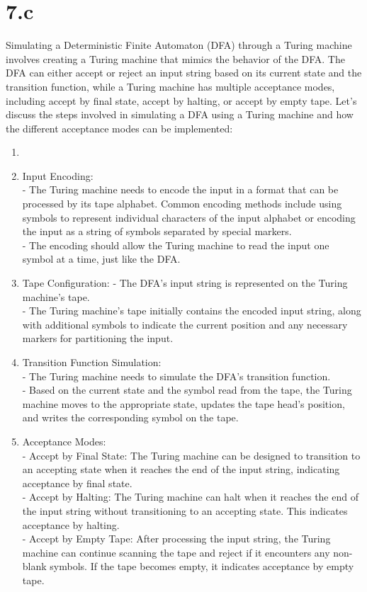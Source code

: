 \section{7.c}
Simulating a Deterministic Finite Automaton (DFA) through a Turing machine involves creating a Turing machine that mimics the behavior of the DFA. The DFA can either accept or reject an input string based on its current state and the transition function, while a Turing machine has multiple acceptance modes, including accept by final state, accept by halting, or accept by empty tape. Let's discuss the steps involved in simulating a DFA using a Turing machine and how the different acceptance modes can be implemented:
\begin{enumerate}
	\item 

\item Input Encoding:\\
   - The Turing machine needs to encode the input in a format that can be processed by its tape alphabet. Common encoding methods include using symbols to represent individual characters of the input alphabet or encoding the input as a string of symbols separated by special markers.\\
   - The encoding should allow the Turing machine to read the input one symbol at a time, just like the DFA.\\

\item Tape Configuration:
   - The DFA's input string is represented on the Turing machine's tape.\\
   - The Turing machine's tape initially contains the encoded input string, along with additional symbols to indicate the current position and any necessary markers for partitioning the input.

\item Transition Function Simulation:\\
   - The Turing machine needs to simulate the DFA's transition function.\\
   - Based on the current state and the symbol read from the tape, the Turing machine moves to the appropriate state, updates the tape head's position, and writes the corresponding symbol on the tape.

\item Acceptance Modes:\\
   - Accept by Final State: The Turing machine can be designed to transition to an accepting state when it reaches the end of the input string, indicating acceptance by final state.\\
   - Accept by Halting: The Turing machine can halt when it reaches the end of the input string without transitioning to an accepting state. This indicates acceptance by halting.\\
   - Accept by Empty Tape: After processing the input string, the Turing machine can continue scanning the tape and reject if it encounters any non-blank symbols. If the tape becomes empty, it indicates acceptance by empty tape.


\end{enumerate}
